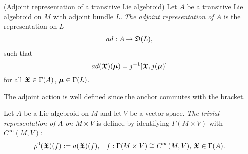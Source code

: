 \begin{definition}(Adjoint representation of a transitive Lie algebroid)\label{defnAdjointAct}
Let $A$ be a transitive Lie algebroid on $M$ with adjoint bundle $L$. \emph{The adjoint representation of $A$} is the representation on $L$
\begin{align*}
    ad: A \to \mathfrak{D}(L), 
\end{align*}
such that
\begin{align*}
     ad(\bm{\mathfrak{X}})(\bm{\mu}) = j^{-1}[\bm{\mathfrak{X}}, j(\bm{\mu})]
\end{align*}
for all $\bm{\mathfrak{X}} \in \Gamma(A)$, $\bm{\mu} \in \Gamma(L)$.
\end{definition}
The adjoint action is well defined since the anchor commutes with the bracket.

    
    
    
    


\begin{definition}\label{definitionTrivialRepresentation}
Let $A$ be a Lie algebroid on $M$ and let $V$ be a vector space. \emph{The trivial representation of $A$ on $M \times V$} is defined by identifying $\Gamma(M \times V)$ with $C^\infty(M, V)$:
\begin{align*}
    \rho^0(\bm{\mathfrak{X}})(f) := a(\bm{\mathfrak{X}})(f), && f: \Gamma(M \times V) \cong C^\infty(M, V),\, \bm{\mathfrak{X}} \in \Gamma(A).
\end{align*}
\end{definition}

